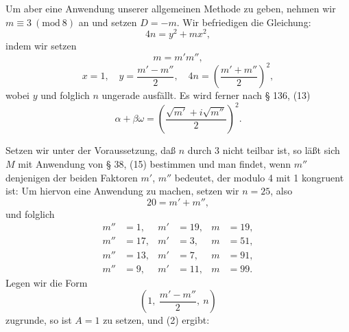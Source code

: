 
Um aber eine Anwendung unserer allgemeinen Methode zu geben, nehmen wir $m \equiv 3\ (\mathrm{mod}\ 8)$ an und setzen $D = -m$. Wir befriedigen die Gleichung:
\[4n = y^2 + mx^2,\]
indem wir setzen
\[m = m'm'',\]
\[x = 1, \quad y = \frac{m'-m''}{2}, \quad 4n = \left(\frac{m'+m''}{2}\right)^2,\]
wobei $y$ und folglich $n$ ungerade ausfällt. Es wird ferner nach § 136, (13)
\[\alpha + \beta\omega = \left(\frac{\sqrt{m'} + i\sqrt{m''}}{2}\right)^2.\]

Setzen wir unter der Voraussetzung, daß $n$ durch 3 nicht teilbar ist,
so läßt sich $M$ mit Anwendung von § 38, (15) bestimmen und man findet, wenn $m''$ denjenigen der beiden Faktoren $m'$, $m''$ bedeutet, der modulo 4 mit 1 kongruent ist:
Um hiervon eine Anwendung zu machen, setzen wir $n = 25$, also
\[20 = m' + m'',\]
und folglich
\[
\begin{aligned}
m'' &= 1,  & m' &= 19, & m &= 19,\\
m'' &= 17, & m' &= 3,  & m &= 51,\\
m'' &= 13, & m' &= 7,  & m &= 91,\\
m'' &= 9,  & m' &= 11, & m &= 99.
\end{aligned}
\]
Legen wir die Form
\[\left(1, \ \frac{m'-m''}{2}, \ n\right)\]
zugrunde, so ist $A = 1$ zu setzen, und (2) ergibt:
